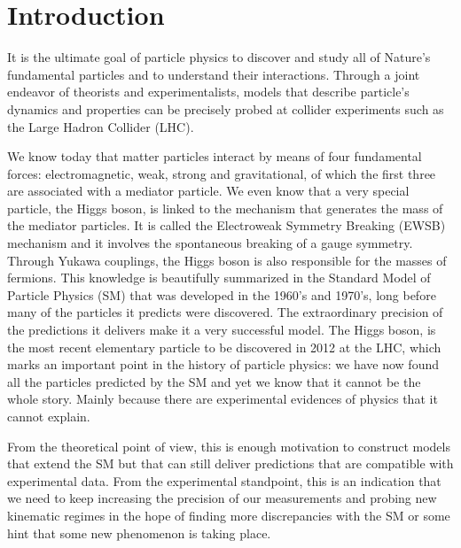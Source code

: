 
\chapter{Introduction}
\label{chapter:introduction}

It is the ultimate goal of particle physics to discover and study all of Nature's fundamental particles and to understand their interactions. Through a joint endeavor of theorists and experimentalists, models that describe particle's dynamics and properties can be precisely probed at collider experiments such as the Large Hadron Collider (LHC). 

We know today that matter particles interact by means of four fundamental forces: electromagnetic, weak, strong and gravitational, of which the first three are associated with a mediator particle. We even know that a very special particle, the Higgs boson, is linked to the mechanism that generates the mass of the mediator particles. It is called the Electroweak Symmetry Breaking (EWSB) mechanism and it involves the spontaneous breaking of a gauge symmetry. Through Yukawa couplings, the Higgs boson is also responsible for the masses of fermions. This knowledge is beautifully summarized in the Standard Model of Particle Physics (SM) that was developed in the 1960's and 1970's, long before many of the particles it predicts were discovered. The extraordinary precision of the predictions it delivers make it a very successful model. The Higgs boson, is the most recent elementary particle to be discovered in 2012 at the LHC, which marks an important point in the history of particle physics: we have now found all the particles predicted by the SM and yet we know that it cannot be the whole story. Mainly because there are experimental evidences of physics that it cannot explain.

From the theoretical point of view, this is enough motivation to construct models that extend the SM but that can still deliver predictions that are compatible with experimental data. From the experimental standpoint, this is an indication that we need to keep increasing the precision of our measurements and probing new kinematic regimes in the hope of finding more discrepancies with the SM or some hint that some new phenomenon is taking place.

